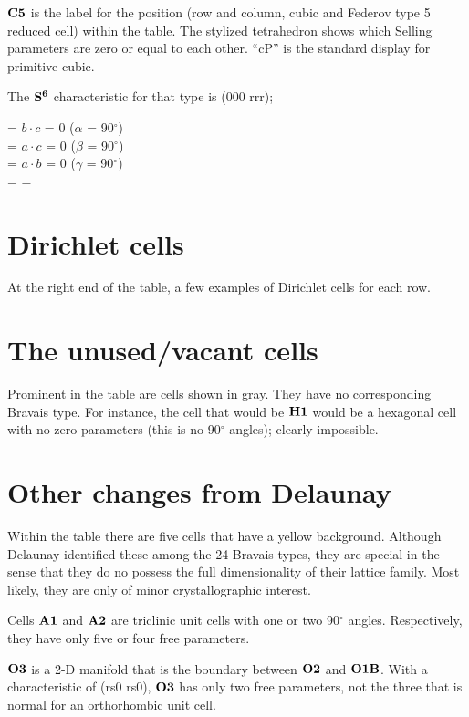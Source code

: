 \documentclass[preprint]{iucr}              %
\numberwithin{equation}{section}
\newcommand{\SVI}[0]{$\bf{S^{6}}$}
\begin{document}
	 $\bf{C5}$ is the label for the position (row and column, cubic and Federov type 5 reduced cell) within
	 the table. The stylized tetrahedron shows which Selling
	 parameters are zero or equal to each other. ``cP'' is the
	 standard display for primitive cubic.
	
	The \SVI{} characteristic for that type is (000 rrr); 
	
	\noindent
	\si{} = $b \cdot c$ = 0 ($\alpha$ = 90$^{\circ}$)\\
	\sii{} = $a \cdot c$ = 0 ($\beta$ = 90$^{\circ}$)\\
	\siii{} = $a \cdot b$ = 0 ($\gamma$ = 90$^{\circ}$)\\
	\siv{} = \sv{} = \svi{}	
	
\section{Dirichlet cells}

	At the right end of the table, a few examples of Dirichlet
	cells for each row. 
	
	
	\cite{fedorov1885elements}
	
	
\section{The unused/vacant cells}

	Prominent in the table are cells shown in gray. They have no
	corresponding Bravais type. For instance, the cell that would be
	$\bf{H1}$ would be a hexagonal cell with no zero parameters
	(this is no 90$^{\circ}$ angles); 
	clearly impossible. 
	
	
	
\section{Other changes from Delaunay}

	Within the table there are five cells that have a yellow
	background. Although Delaunay identified these among the 24
	Bravais types, they are special in the sense that they
	do no possess the full dimensionality of their lattice
	family. Most likely, they are only of minor crystallographic 
	interest.
	
	Cells $\bf{A1}$ and $\bf{A2}$ are triclinic unit cells with 
	one or two 90$^{\circ}$ angles. Respectively, they have only five
	or four free parameters.
	
	$\bf{O3}$ is a 2-D manifold that is the boundary between
	 $\bf{O2}$ and $\bf{O1B}$.
	With a characteristic of (rs0 rs0), $\bf{O3}$ has only two
	free parameters, not the three that is normal for an 
	orthorhombic unit cell.
	
\end{document}

